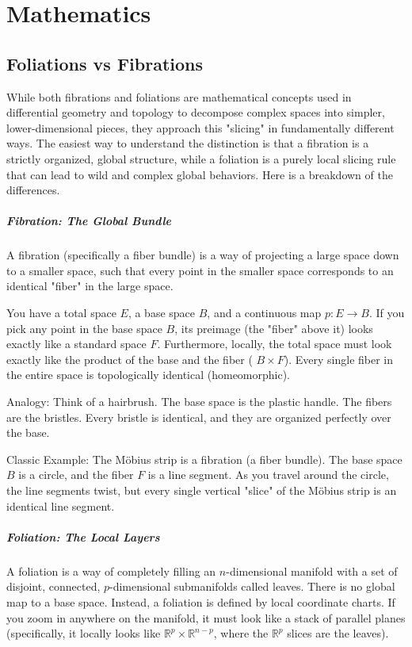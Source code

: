 \chapter{Mathematics}
\label{ch:math}
\section{Foliations vs Fibrations} %
\label{sec:math-fvsf}

While both fibrations and foliations are mathematical concepts used in
differential geometry and topology to decompose complex spaces into simpler,
lower-dimensional pieces, they approach this "slicing" in fundamentally
different ways.
The easiest way to understand the distinction is that a fibration is a strictly
organized, global structure, while a foliation is a purely local slicing rule
that can lead to wild and complex global behaviors.
Here is a breakdown of the differences.

\paragraph{Fibration: The Global Bundle}
A fibration (specifically a fiber bundle) is a way of projecting a large space
down to a smaller space, such that every point in the smaller space corresponds
to an identical "fiber" in the large space.

 You have a total space $ E $, a base space $B$, and a continuous map $p:E
 \to B$. If you pick any point in the base space $B$, its preimage (the
 "fiber" above it) looks exactly like a standard space $F$. Furthermore,
 locally, the total space must look exactly like the product of the base and
 the fiber ( $B \times F$). Every single fiber in the entire space is 
 topologically identical (homeomorphic).

Analogy: Think of a hairbrush. The base space is the plastic handle. The fibers are the bristles. Every bristle is identical, and they are organized perfectly over the base.

Classic Example: The Möbius strip is a fibration (a fiber bundle). The base space 
$B$ is a circle, and the fiber $F$ is a line segment. As you travel around the
circle, the line segments twist, but every single vertical "slice" of the
Möbius strip is an identical line segment.

\paragraph{Foliation: The Local Layers}
A foliation is a way of completely filling an 
$n$-dimensional manifold with a set of disjoint, connected, 
$p$-dimensional submanifolds called leaves.
 There is no global map to a base space. Instead, a foliation is defined by
 local coordinate charts.
If you zoom in anywhere on the manifold, it must look like a stack of parallel
planes (specifically, it locally looks like $\mathbb{R}^p \times \mathbb{R}^{n-p}$, where the 
$\mathbb{R}^p$ slices are the leaves).

